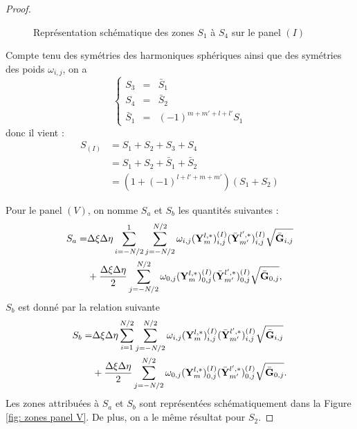 \begin{proof}
\begin{figure}
\begin{center}
\end{center}
\caption{Représentation schématique des zones $S_1$ à $S_4$ sur le panel $(I)$}
\label{fig: zones panel I}
\end{figure}

Compte tenu des symétries des harmoniques sphériques ainsi que des symétries des poids $\omega_{i,j}$, on a
\begin{equation}
\left\lbrace
\begin{array}{rcl}
S_3 & = & \bar{S}_1 \\
S_4 & = & \bar{S}_2 \\
\bar{S}_1 & = & (-1)^{m+m'+l+l'} S_1
\end{array}
\right.
\end{equation}
donc il vient :
\begin{align*}
S_{(I)} & = S_1 + S_2 + S_3 + S_4 \\
	& = S_1 + S_2 + \bar{S}_1 + \bar{S}_2 \\
	& = (1+(-1)^{l+l'+m+m'})(S_1+S_2)
\end{align*}

Pour le panel $(V)$, on nomme $S_a$ et $S_b$ les quantités suivantes :
\begin{align*}
S_a = & \Delta \xi \Delta \eta \displaystyle\sum\limits_{i=-N/2}^{1} \displaystyle\sum\limits_{j=-N/2}^{N/2} \omega_{i,j} (\mathbf{Y}_m^{l,*})_{i,j}^{(I)} (\bar{\mathbf{Y}}_{m'}^{l',*})_{i,j}^{(I)} \sqrt{\bar{\mathbf{G}}_{i,j}} \\
		& + \dfrac{\Delta \xi \Delta \eta}{2} \displaystyle\sum\limits_{j=-N/2}^{N/2} \omega_{0,j} (\mathbf{Y}_m^{l,*})_{0,j}^{(I)} (\bar{\mathbf{Y}}_{m'}^{l',*})_{0,j}^{(I)} \sqrt{\bar{\mathbf{G}}_{0,j}},
\end{align*}
$S_b$ est donné par la relation suivante 
\begin{align*}
S_b = & \Delta \xi \Delta \eta \displaystyle\sum\limits_{i=1}^{N/2} \displaystyle\sum\limits_{j=-N/2}^{N/2} \omega_{i,j} (\mathbf{Y}_m^{l,*})_{i,j}^{(I)} (\bar{\mathbf{Y}}_{m'}^{l',*})_{i,j}^{(I)} \sqrt{\bar{\mathbf{G}}_{i,j}} \\
		& + \dfrac{\Delta \xi \Delta \eta}{2} \displaystyle\sum\limits_{j=-N/2}^{N/2} \omega_{0,j} (\mathbf{Y}_m^{l,*})_{0,j}^{(I)} (\bar{\mathbf{Y}}_{m'}^{l',*})_{0,j}^{(I)} \sqrt{\bar{\mathbf{G}}_{0,j}}.
\end{align*}
Les zones attribuées à $S_a$ et $S_b$ sont représentées schématiquement dans la Figure \ref{fig: zones panel V}. De plus, on a le même résultat pour $S_2$.


\end{proof}
